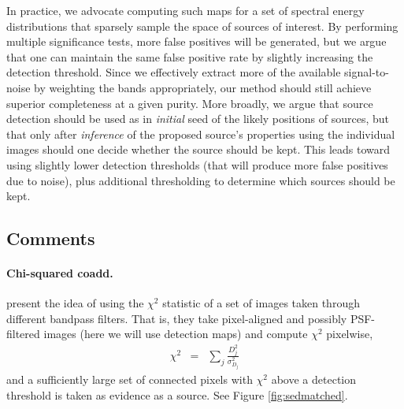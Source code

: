 \documentclass[letterpaper,preprint]{aastex62}
\begin{document}
In practice, we advocate computing such maps for a set of spectral
energy distributions that sparsely sample the space of sources of
interest.  By performing multiple significance tests, more false
positives will be generated, but we argue that one can maintain the
same false positive rate by slightly increasing the detection
threshold.  Since we effectively extract more of the available
signal-to-noise by weighting the bands appropriately, our method
should still achieve superior completeness at a given purity.
%
More broadly, we argue that source detection should be used as in
\emph{initial} seed of the likely positions of sources, but that only
after \emph{inference} of the proposed source's properties using the
individual images should one decide whether the source should be kept.
This leads toward using slightly lower detection thresholds (that will
produce more false positives due to noise), plus additional
thresholding to determine which sources should be kept.


\subsection{Comments}

\paragraph{Chi-squared coadd.}
\cite{szalay1999} present the idea of using the $\chi^2$
statistic of a set of images taken through different bandpass filters.
That is, they take pixel-aligned and possibly PSF-filtered images
(here we will use detection maps) and compute $\chi^2$ pixelwise,
\begin{eqnarray}
  \chi^2 &=& \sum_j \frac{D_j^2}{\sigma_{D_j}^2}
\end{eqnarray}
and a sufficiently large set of connected pixels with $\chi^2$ above a
detection threshold is taken as evidence as a source.  See Figure
\ref{fig:sedmatched}.
\end{document}
